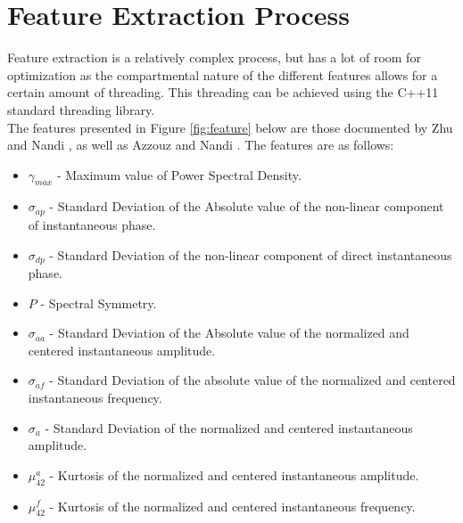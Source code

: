 \documentclass[10pt,twocolumn]{witseiepaper}
\begin{document}


\newpage

\onecolumn
\appendix
{}
\section{Feature Extraction Process}
\label{app:feature}
Feature extraction is a relatively complex process, but has a lot of room for optimization as the compartmental nature of the different features allows for a certain amount of threading. This threading can be achieved using the C++11 standard threading library.\\[11pt]
The features presented in Figure \ref{fig:feature} below are those documented by Zhu and Nandi \cite{zhu2014automatic}, as well as Azzouz and Nandi \cite{azzouz2013automatic}. The features are as follows: 
\begin{itemize}
	\item $\gamma_{max}$ - Maximum value of Power Spectral Density.
	\item $\sigma_{ap}$ - Standard Deviation of the Absolute value of the non-linear component of instantaneous phase.
	\item $\sigma_{dp}$ - Standard Deviation of the non-linear component of direct instantaneous phase.
	\item $P$ - Spectral Symmetry.
	\item $\sigma_{aa}$ - Standard Deviation of the Absolute value of the normalized and centered instantaneous amplitude.
	\item $\sigma_{af}$ - Standard Deviation of the absolute value of the normalized and centered instantaneous frequency.
	\item $\sigma_{a}$ - Standard Deviation of the normalized and centered instantaneous amplitude.
	\item $\mu_{42}^{a}$ - Kurtosis of the normalized and centered instantaneous amplitude.
	\item $\mu_{42}^{f}$ - Kurtosis of the normalized and centered instantaneous frequency.
\end{itemize}
\end{document}
